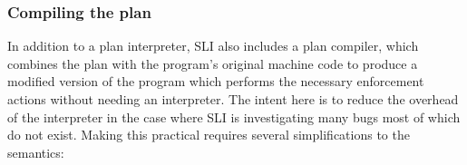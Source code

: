 

\subsubsection{Compiling the plan}


In addition to a plan interpreter, SLI also includes a plan compiler, which combines the plan with the program's original machine code to produce a modified version of the program which performs the necessary enforcement actions without needing an interpreter.
The intent here is to reduce the overhead of the interpreter in the case where SLI is investigating many bugs most of which do not exist.
Making this practical requires several simplifications to the semantics:

